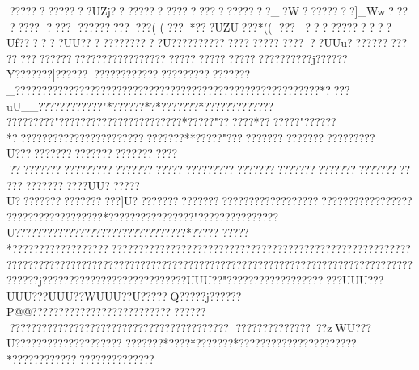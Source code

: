 {{{{{{{{{{{{{{{{{{{{{{{{{{{{{{{{{{{{{{{{{{{{{{{{{{{{{{{{{{{{{{{{{{{{{{{{{{{{{{{{{{{{{{{{{{{{{{{{{{{{{{{{{{{{{{{{{{{{{{{{{{{{{{{{{{{{{{{{{{{{{{{{{{{{{{{{{{{{{{{{{{{{{{{{{{{{{{{{{{{{{{{{{{{{{{{{{{{{{{{{{{{{{{{{{{{{{{{{{{{{{{{{{{{{{{{{{{{{{{{{{{{{{{{{{{{{{{{{{{{{{{{{{{{{{{{{{{{{{{{{{{{{{{{{{{{{{{{{{{{{{{{{{{{{{{{{{{{{{{{{{{{{{{{{{{{{{{{{{{{{{{{{{{{{{{{{{{{{{{{{{{{{{{{{{{{{{{{{{{{{{{{{{{{{{{{{{{{{{{{{{{{{{{{{{{{{{{{{{{{{{{{{{{{{{{{{{{{{{{{{{{{{{{{{{{{{{{{{{{{{{{{{{{{{{{{{{{{{{{{{{{{{{{{{{{{{{{{{{{{{{{{{{{{{{{{{{{{{{{{{{{{{{{{{{{{{{{{{{{{{{{{{{{{{{{{{{{{{{{{{{{{{{{{{{{{{{{{{{{{{{{{{{{{{{{{{{{{{{{{{{{{{{{{{{{{{{{{{{{{{{{{{{{{{{{{{{{{{{{{{{{{{{{{{{{{{{{{{{{{{{{{{{{{{{{{{{{{{{{{{{{{{{{{{{{{{{{{{{{{{{{{{{{{{{{{{{{{{{{{{{{{{{{{{{{{{{{{{{{{{{{{{{{{{{{{{{{{{{{{{{{{{{{{{{{{{{{{{{{{{{{{{{{{{{{{{{{{{{{{{{{{{{{{{{{{{{{{{{{{{{{{{{{{{{{{{{{{{{{{{{{{{{{{{{{{{{{{{{{{{{{{{{{{{{{{{{{{{{{{{{{{{{{{{{{{{{{{{{{{{{{{{{{{{{{{{{{{{{{{{{{{{{{{{{{{{{{{{{{{{{{{{{{{{{{{{{{{{{{{{{{{{{{{{{{{{{{{{{{{{{{{{{{{{{{{{{{{{{{{{{{{{{{{{{{{{{{{{{{{{{{{{{{{{{{{{{{{{{{{{{{{{{{{{{{{{{{{{{{{{{{{{{{{{{{{{{{{{{{{{{{{{{{{{{{{{{{{{{{{{{{{{{{{{{{{{{{{{{{{{{{{{{{{{{{{{{{{{{{{{{{{{{{{{{{{{{{{{{{{{{{{{{{{{{{{{{{{{{{{{{{{{{{{{{{{{{{{{{{{{{{{{{{{{{{{{{{{{{{{{{{{{{{{{{{{{{{{{{{{{{{{{{{{{{{{{{{{{{{{{{{{{{{{{{{{{{{{{{{{{{{{{{{{{{{{{{{{{{{{{{{{{{{{{{{{{{{{{{{{{{{{{{{{{{{{{{{{{{{{{{{{{{{{{{{{{{{{{{{{{{{{{{{{{{{{{{{{{{{{{{{{{{{{{{{{{{{{{{{{{{{{{{{{{{{{{{{{{{{{{{{{{{{{{{{{{{{{{{{{{{{{{{{{{{{{{{{{{{{{{{{{{{{{{{{{{{{{{{{{{{{{{{{{{{{{{{{{{{{{{{{{{{{{{{{{{{{{{{{{{{{{{{{{{{{{{{{{{{{{{{{{{{{{{{{{{{{{{{{{{{{{{{{{{{{{{{{{{{{{{{{{{{{{{{{{{{{{{{{{{{{{{{{{{{{{{{{{{{{{{{{{{{{{{{{{{{{{{{{{{{{{{{{{{{{{{{{{{{{{{{{{{{{{{{{{{{{{{{{{{{{{{{{{{{{{{{{{{{{{{{{{{{{{{{{{{{{{{{{{{{{{{{{{{{{{{{{{{{{{{{{{{{{{{{{{{{{{{{{{{{{{{{{{{{{{{{{{{{{{{{{{{{{{{{{{{{{{{{{{{{{{{{{{{{{{{{{{{{{{{{{{{{{{{{{?????????????UZj????????????????????????_?W????????]_Ww???
?????
  ????
 ?????????  ???(
 (???*???UZU???*((
??? 
 ??    ????????   ??Uf????    ??UU????    ?????????U?????????????  ? ????? ???? ??UUu???? ??????  ?????   ????????????????????????????????????????????????j??????Y???????}]??????????????????????????????????_?????????????????????????????????????????????????????????*????uU__????????????"*??????*?*???????*?????????????
?????????"???????????????????????*?????"??????*???????"??????*???????????????????????????????**???? ?"??????????????????????????U???????????????????????????????????????????????????????????????????????????????????????????????????????????????UU??????U??????????????????]U}?????????????????????????? ??????? ???????????????????????????????????*????? ???????????"???????????????U????????????????????????????????*?????
?????*????????????????????????????????????????????????????????????????????????????????????????????????????????????????????????????????????????????????????????????j???????????????????????????UUU??"   ?????????????????????UUU???UUU???UUU??WUUU??U?????  Q?????j??    ??    ?? P@@????????    ??   ???????????????? ???????????????????????????????????????????}????
??   ????????????~??zWU???U???????????????????? ???????  *????*???????*???????????????  ?????? ?*??????????????????? ???????  }}}}}}}}}}}}}}}}}}}}}}}}}}}}}}}}}}}}}}}}}}}}}}}}}}}}}}}}}}}}}}}}}}}}}}}}}}}}}}}}}}}}}}}}}}}}}}}}}}}}}}}}}}}}}}}}}}}}}}}}}}}}}}}}}}}}}}}}}}}}}}}}}}}}}}}}}}}}}}}}}}}}}}}}}}}}}}}}}}}}}}}}}}}}}}}}}}}}}}}}}}}}}}}}}}}}}}}}}}}}}}}}}}}}}}}}}}}}}}}}}}}}}}}}}}}}}}}}}}}}}}}}}}}}}}}}}}}}}}}}}}}}}}}}}}}}}}}}}}}}}}}}}}}}}}}}}}}}}}}}}}}}}}}}}}}}}}}}}}}}}}}}}}}}}}}}}}}}}}}}}}}}}}}}}}}}}}}}}}}}}}}}}}}}}}}}}}}}}}}}}}}}}}}}}}}}}}}}}}}}}}}}}}}}}}}}}}}}}}}}}}}}}}}}}}}}}}}}}}}}}}}}}}}}}}}}}}}}}}}}}}}}}}}}}}}}}}}}}}}}}}}}}}}}}}}}}}}}}}}}}}}}}}}}}}}}}}}}}}}}}}}}}}}}}}}}}}}}}}}}}}}}}}}}}}}}}}}}}}}}}}}}}}}}}}}}}}}}}}}}}}}}}}}}}}}}}}}}}}}}}}}}}}}}}}}}}}}}}}}}}}}}}}}}}}}}}}}}}}}}}}}}}}}}}}}}}}}}}}}}}}}}}}}}}}}}}}}}}}}}}}}}}}}}}}}}}}}}}}}}}}}}}}}}}}}}}}}}}}}}}}}}}}}}}}}}}}}}}}}}}}}}}}}}}}}}}}}}}}}}}}}}}}}}}}}}}}}}}}}}}}}}}}}}}}}}}}}}}}}}}}}}}}}}}}}}}}}}}}}}}}}}}}}}}}}}}}}}}}}}}}}}}}}}}}}}}}}}}}}}}}}}}}}}}}}}}}}}}}}}}}}}}}}}}}}}}}}}}}}}}}}}}}}}}}}}}}}}}}}}}}}}}}}}}}}}}}}}}}}}}}}}}}}}}}}}}}}}}}}}}}}}}}}}}}}}}}}}}}}}}}}}}}}}}}}}}}}}}}}}}}}}}}}}}}}}}}}}}}}}}}}}}}}}}}}}}}}}}}}}}}}}}}}}}}}}}}}}}}}}}}}}}}}}}}}}}}}}}}}}}}}}}}}}}}}}}}}}}}}}}}}}}}}}}}}}}}}}}}}}}}}}}}}}}}}}}}}}}}}}}}}}}}}}}}}}}}}}}}}}}}}}}}}}}}}}}}}}}}}}}}}}}}}}}}}}}}}}}}}}}}}}}}}}}}}}}}}}}}}}}}}}}}}}}}}}}}}}}}}}}}}}}}}}}}}}}}}}}}}}}}}}}}}}}}}}}}}}}}}}}}}}}}}}}}}}}}}}}}}}}}}}}}}}}}}}}}}}}}}}}}}}}}}}}}}}}}}}}}}}}}}}}}}}}}}}}}}}}}}}}}}}}}}}}}}}}}}}}}}}}}}}}}}}}}}}}}}}}}}}}}}}}}}}}}}}}}}}}}}}}}}}}}}}}}}}}}}}}}}}}}}}}}}}}}}}}}}}}}}}}}}}}}}}}}}}}}}}}}}}}}}}}}}}}}}}}}}}}}}}}}}}}}}}}}}}}}}}}}}}}}}}}}}}}}}}}}}}}}}}}}}}}}}}}}}}}}}}}}}}}}}}}}}}}}}}}}}}}}}}}}}}}}}}}}}}}}}}}}}}}}}}}}}}}}}}}}}}}}}}}}}}}}}}}}}}}}}}}}}}}}}}}}}}}}}}}}}}}}}}}}}}}}}}}}}}}}}}}}}}}}}}}}}}}}}}}}}}}}}}}}}}}}}}}}}}}}}}}}}}}}}}}}}}}}}}}}}}}}}}}}}}}}}}}}}}}}}}}}}}}}}}}}}}}}}}}}}}}}}}}}}}}}}}}}}}}}}}}}}}}}}}}}}
